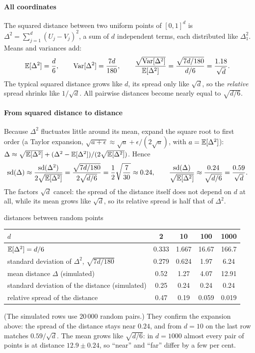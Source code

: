 \documentclass[11pt]{article}
\begin{document}
\paragraph{All coordinates} The squared distance between two uniform points of $[0, 1]^d$ is
$\Delta^2 = \sum_{j=1}^d (U_j - V_j)^2$, a sum of $d$ independent terms, each distributed like $\Delta_1^2$. Means and
variances add:
\[
  \mathbb{E}[\Delta^2] = \frac{d}{6}, \qquad \operatorname{Var}[\Delta^2] = \frac{7d}{180}, \qquad
  \frac{\sqrt{\operatorname{Var}[\Delta^2]}}{\mathbb{E}[\Delta^2]} = \frac{\sqrt{7d/180}}{d/6} = \frac{1.18}{\sqrt d} .
\]
The typical squared distance grows like $d$, its spread only like $\sqrt d$, so the \emph{relative} spread shrinks like
$1/\sqrt d$. All pairwise distances become nearly equal to $\sqrt{d/6}$.

\paragraph{From squared distance to distance} Because $\Delta^2$ fluctuates little around its mean, expand the square
root to first order (a Taylor expansion, $\sqrt{a + \epsilon} \approx \sqrt a + \epsilon/(2\sqrt a)$, with
$a = \mathbb{E}[\Delta^2]$): $\Delta \approx \sqrt{\mathbb{E}[\Delta^2]} + (\Delta^2 - \mathbb{E}[\Delta^2])/(2\sqrt{\mathbb{E}[\Delta^2]})$. Hence
\[
  \mathrm{sd}(\Delta) \approx \frac{\mathrm{sd}(\Delta^2)}{2\sqrt{\mathbb{E}[\Delta^2]}} = \frac{\sqrt{7d/180}}{2\sqrt{d/6}}
  = \frac12\sqrt{\frac{7}{30}} \approx 0.24,
  \qquad
  \frac{\mathrm{sd}(\Delta)}{\sqrt{\mathbb{E}[\Delta^2]}} \approx \frac{0.24}{\sqrt{d/6}} = \frac{0.59}{\sqrt d} .
\]
The factors $\sqrt d$ cancel: the spread of the distance itself does not depend on $d$ at all, while its mean grows
like $\sqrt d$, so its relative spread is half that of $\Delta^2$.

\begin{worked}{distances between random points}
\begin{center}\small
\begin{tabular}{@{}lcccc@{}}\toprule
$d$ & 2 & 10 & 100 & 1000 \\ \midrule
$\mathbb{E}[\Delta^2] = d/6$ & 0.333 & 1.667 & 16.67 & 166.7 \\
standard deviation of $\Delta^2$, $\sqrt{7d/180}$ & 0.279 & 0.624 & 1.97 & 6.24 \\
mean distance $\Delta$ (simulated) & 0.52 & 1.27 & 4.07 & 12.91 \\
standard deviation of the distance (simulated) & 0.25 & 0.24 & 0.24 & 0.24 \\
relative spread of the distance & 0.47 & 0.19 & 0.059 & 0.019 \\ \bottomrule
\end{tabular}
\end{center}
(The simulated rows use $20\,000$ random pairs.) They confirm the expansion above: the spread of the distance stays
near $0.24$, and from $d = 10$ on the last row matches $0.59/\sqrt d$. The mean grows like
$\sqrt{d/6}$: in $d = 1000$ almost every pair of points is at distance $12.9 \pm 0.24$, so ``near'' and ``far'' differ
by a few per cent.
\end{worked}
\end{document}
